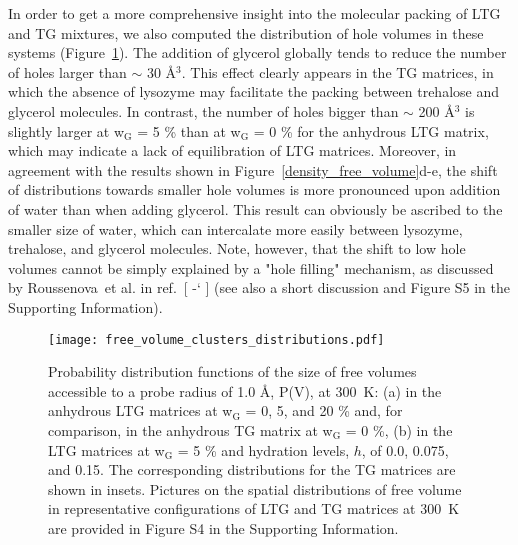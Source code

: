 \documentclass[journal=jpcbfk,manuscript=article]{achemso}
\newcommand*{\citen}[1]{%
\begingroup
\romannumeral-`\x %
\setcitestyle{numbers}%
\cite{#1}%
\endgroup   
}
\begin{document}
\begin{singlespacing}
\newpage

In order to get a more comprehensive insight into the molecular packing of LTG and TG
mixtures, we also computed the distribution of hole volumes in these systems
(Figure~\ref{free_volume_distribution}).
The addition of glycerol globally tends to reduce the number of holes larger than $\sim$
30 \AA \/$^{\textrm{3}}$.
This effect clearly appears in the TG matrices, in which the absence of lysozyme may
facilitate the packing between trehalose and glycerol molecules. In contrast, the number of holes bigger than
$\sim$ 200 \AA \/$^{\textrm{3}}$ is slightly larger at w$_{\textrm{G}}$ = 5 \% than at w$_{\textrm{G}}$ = 0 \% for the
anhydrous LTG matrix, which may indicate a lack of equilibration of LTG matrices. Moreover, in agreement with the results
shown in Figure~\ref{density_free_volume}d-e, the shift of distributions towards smaller hole volumes is more pronounced
upon addition of water than when adding glycerol. This result can obviously be ascribed to the smaller size of water,
which can intercalate more easily between lysozyme, trehalose, and glycerol molecules. Note, however, that the shift to low
hole volumes cannot be simply explained by a "hole filling" mechanism, as discussed by Roussenova~et al.
in ref.~[\citen{Roussenova2010}] (see also a short discussion and Figure S5 in the Supporting Information).

\newpage

\begin{figure}[htbp]
\texttt{[image: free\_volume\_clusters\_distributions.pdf]}
\caption{\label{free_volume_distribution}
Probability distribution functions of the size of free volumes accessible to a probe radius of 1.0 \AA \/, P(V), at 300~K: 
(a) in the anhydrous LTG matrices at w$_{\textrm{G}}$ = 0, 5, and 20 \% and, for comparison, in the anhydrous TG matrix
at w$_{\textrm{G}}$ = 0 \%, (b) in the LTG matrices at w$_{\textrm{G}}$ = 5 \% and hydration levels, $h$, of 0.0,
0.075, and 0.15. The corresponding distributions for the TG matrices are shown in insets. Pictures on the spatial distributions
of free volume in representative configurations of LTG and TG matrices at 300~K are provided in Figure S4 in the Supporting Information.
}
\end{figure}



\end{singlespacing}
\end{document}
